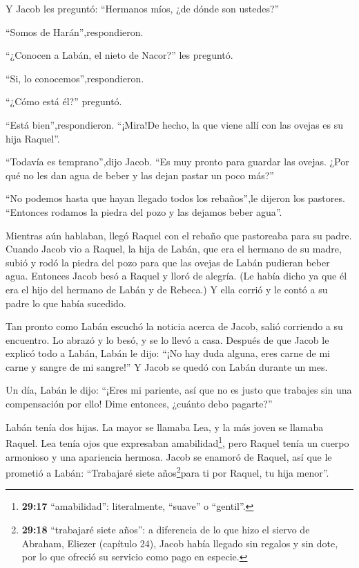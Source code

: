  Y Jacob les preguntó: ``Hermanos míos, ¿de dónde son
ustedes?''

``Somos de Harán'',respondieron.

 ``¿Conocen a Labán, el nieto de Nacor?'' les preguntó.

``Si, lo conocemos'',respondieron.

 ``¿Cómo está él?'' preguntó.

``Está bien'',respondieron. ``¡Mira!De hecho, la que viene allí con las
ovejas es su hija Raquel''.

 ``Todavía es temprano'',dijo Jacob. ``Es muy pronto para
guardar las ovejas. ¿Por qué no les dan agua de beber y las dejan pastar
un poco más?''

 ``No podemos hasta que hayan llegado todos los rebaños'',le
dijeron los pastores. ``Entonces rodamos la piedra del pozo y las
dejamos beber agua''.

 Mientras aún hablaban, llegó Raquel con el rebaño que
pastoreaba para su padre.  Cuando Jacob vio a Raquel, la
hija de Labán, que era el hermano de su madre, subió y rodó la piedra
del pozo para que las ovejas de Labán pudieran beber agua. 
Entonces Jacob besó a Raquel y lloró de alegría.  (Le había
dicho ya que él era el hijo del hermano de Labán y de Rebeca.) Y ella
corrió y le contó a su padre lo que había sucedido.

 Tan pronto como Labán escuchó la noticia acerca de Jacob,
salió corriendo a su encuentro. Lo abrazó y lo besó, y se lo llevó a
casa. Después de que Jacob le explicó todo a Labán,  Labán
le dijo: ``¡No hay duda alguna, eres carne de mi carne y sangre de mi
sangre!'' Y Jacob se quedó con Labán durante un mes.

 Un día, Labán le dijo: ``¡Eres mi pariente, así que no es
justo que trabajes sin una compensación por ello! Dime entonces, ¿cuánto
debo pagarte?''

 Labán tenía dos hijas. La mayor se llamaba Lea, y la más
joven se llamaba Raquel.  Lea tenía ojos que expresaban
amabilidad\footnote{\textbf{29:17} ``amabilidad'': literalmente,
  ``suave'' o ``gentil''.}, pero Raquel tenía un cuerpo armonioso y una
apariencia hermosa.  Jacob se enamoró de Raquel, así que le
prometió a Labán: ``Trabajaré siete años\footnote{\textbf{29:18}
  ``trabajaré siete años'': a diferencia de lo que hizo el siervo de
  Abraham, Eliezer (capítulo 24), Jacob había llegado sin regalos y sin
  dote, por lo que ofreció su servicio como pago en especie.}para ti por
Raquel, tu hija menor''.

